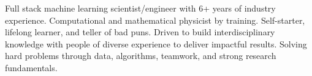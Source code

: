 

\begin{cvparagraph}

Full stack machine learning scientist/engineer with 6+ years of industry experience. Computational and mathematical physicist by training. Self-starter, lifelong learner, and teller of bad puns. Driven to build interdisciplinary knowledge with people of diverse experience to deliver impactful results. Solving hard problems through data, algorithms, teamwork, and strong research fundamentals. 
\end{cvparagraph}